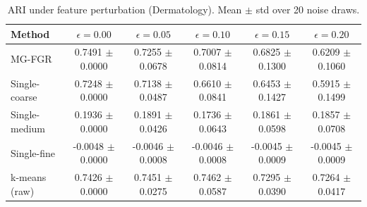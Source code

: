 \begin{table}[htbp]
  \centering
  \caption{ARI under feature perturbation (Dermatology). Mean $\pm$ std over 20 noise draws.}
  \label{tab:robustness}
  \begin{tabular}{lccccc}
    \toprule
    \textbf{Method} & $\epsilon=0.00$ & $\epsilon=0.05$ & $\epsilon=0.10$ & $\epsilon=0.15$ & $\epsilon=0.20$ \\
    \midrule
    MG-FGR & 0.7491 $\pm$ 0.0000 & 0.7255 $\pm$ 0.0678 & 0.7007 $\pm$ 0.0814 & 0.6825 $\pm$ 0.1300 & 0.6209 $\pm$ 0.1060 \\
    Single-coarse & 0.7248 $\pm$ 0.0000 & 0.7138 $\pm$ 0.0487 & 0.6610 $\pm$ 0.0841 & 0.6453 $\pm$ 0.1427 & 0.5915 $\pm$ 0.1499 \\
    Single-medium & 0.1936 $\pm$ 0.0000 & 0.1891 $\pm$ 0.0426 & 0.1736 $\pm$ 0.0643 & 0.1861 $\pm$ 0.0598 & 0.1857 $\pm$ 0.0708 \\
    Single-fine & -0.0048 $\pm$ 0.0000 & -0.0046 $\pm$ 0.0008 & -0.0046 $\pm$ 0.0008 & -0.0045 $\pm$ 0.0009 & -0.0045 $\pm$ 0.0009 \\
    k-means (raw) & 0.7426 $\pm$ 0.0000 & 0.7451 $\pm$ 0.0275 & 0.7462 $\pm$ 0.0587 & 0.7295 $\pm$ 0.0390 & 0.7264 $\pm$ 0.0417 \\
    \bottomrule
  \end{tabular}
\end{table}